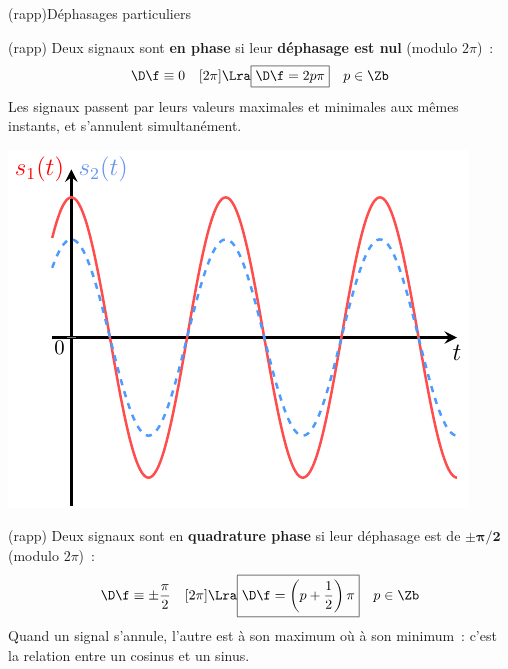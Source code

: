 \documentclass[../../main/main.tex]{subfiles}
\begin{document}
\begin{tcb}[breakable](rapp){Déphasages particuliers}
	\vspace{-10pt}
	\begin{isd}[righthand ratio=.3, interior hidden](rapp)
		Deux signaux sont \textbf{en phase} si leur \textbf{déphasage est nul}
		(modulo $2\pi$)~:
		\[
			\D\f \equiv 0\quad[2\pi]
			\Lra
			\boxed{\D\f = 2p\pi}
			\quad p \in \Zb
		\]
		Les signaux passent par leurs valeurs maximales et minimales aux mêmes
		instants, et s'annulent simultanément.
		\tcblower
		\begin{center}
			\includegraphics[width=\linewidth]{dfeq0.pdf}
			\captionsetup{justification=centering}
		\end{center}
	\end{isd}
	\vspace{-15pt}
	\begin{isd}[righthand ratio=.3, interior hidden](rapp)
		Deux signaux sont en \textbf{quadrature phase} si leur déphasage est de
		$\mathbf{\pm\pi/2}$ (modulo $2\pi$)~:
		\[
			\D\f \equiv \pm\frac{\pi}{2} \quad[2\pi]
			\Lra
			\boxed{\D\f = \left( p+\frac{1}{2} \right)\pi}
			\quad p \in \Zb
		\]
		Quand un signal s'annule, l'autre est à son maximum où à son minimum~:
		c'est la relation entre un cosinus et un sinus.
		\tcblower
		\begin{center}

\end{center}
\end{isd}
\end{tcb}
\end{document}
